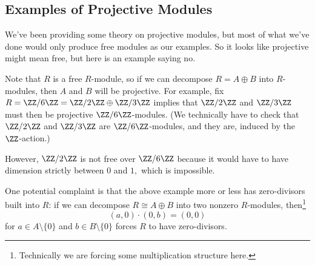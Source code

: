 \documentclass[../notes.tex]{subfiles}
\begin{document}
\subsection{Examples of Projective Modules}
We've been providing some theory on projective modules, but most of what we've done would only produce free modules as our examples. So it looks like projective might mean free, but here is an example saying no.
\begin{example}
	Note that $R$ is a free $R$-module, so if we can decompose $R=A\oplus B$ into $R$-modules, then $A$ and $B$ will be projective. For example, fix $R=\ZZ/6\ZZ=\ZZ/2\ZZ\oplus\ZZ/3\ZZ$ implies that $\ZZ/2\ZZ$ and $\ZZ/3\ZZ$ must then be projective $\ZZ/6\ZZ$-modules. (We technically have to check that $\ZZ/2\ZZ$ and $\ZZ/3\ZZ$ are $\ZZ/6\ZZ$-modules, and they are, induced by the $\ZZ$-action.)
	
	However, $\ZZ/2\ZZ$ is not free over $\ZZ/6\ZZ$ because it would have to have dimension strictly between $0$ and $1,$ which is impossible.
\end{example}
One potential complaint is that the above example more or less has zero-divisors built into $R$: if we can decompose $R\cong A\oplus B$ into two nonzero $R$-modules, then\footnote{Technically we are forcing some multiplication structure here.}
\[(a,0)\cdot(0,b)=(0,0)\]
for $a\in A\setminus\{0\}$ and $b\in B\setminus\{0\}$ forces $R$ to have zero-divisors.
\end{document}
